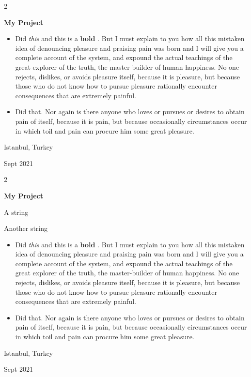\documentclass[10pt, letterpaper]{article}
\newenvironment{summary}{
    \begin{description}[
        topsep=0.10 cm,
        parsep=0.10 cm,
        partopsep=0pt,
        itemsep=0pt,
        leftmargin=0.4 cm + 10pt
    ]
}{
    \end{description}
} %
\newenvironment{highlights}{
    \begin{itemize}[
        topsep=0.10 cm,
        parsep=0.10 cm,
        partopsep=0pt,
        itemsep=0pt,
        leftmargin=0.4 cm + 10pt
    ]
}{
    \end{itemize}
} %
\newenvironment{twocolentry}[2][]{
    \onecolentry
    \def\secondColumn{#2}
    \setcolumnwidth{\fill, 4.5 cm}
    \begin{paracol}{2}
}{
    \switchcolumn \raggedleft \secondColumn
    \end{paracol}
    \endonecolentry
} %
\let\hrefWithoutArrow\href
\renewcommand{\href}[2]{\hrefWithoutArrow{#1}{\ifthenelse{\equal{#2}{}}{ }{#2 }\raisebox{.15ex}{\footnotesize \faExternalLink*}}}
\begin{document}
        \begin{twocolentry}{
            Istanbul, Turkey

        Sept 2021
        }
            \textbf{My Project}
            \begin{highlights}
                \item Did \textit{this} and this is a \textbf{bold} \href{https://example.com}{link}. But I must explain to you how all this mistaken idea of denouncing pleasure and praising pain was born and I will give you a complete account of the system, and expound the actual teachings of the great explorer of the truth, the master-builder of human happiness. No one rejects, dislikes, or avoids pleasure itself, because it is pleasure, but because those who do not know how to pursue pleasure rationally encounter consequences that are extremely painful.
                \item Did that. Nor again is there anyone who loves or pursues or desires to obtain pain of itself, because it is pain, but because occasionally circumstances occur in which toil and pain can procure him some great pleasure.
            \end{highlights}
        \end{twocolentry}


        \vspace{0.2 cm}

        \begin{twocolentry}{
            Istanbul, Turkey

        Sept 2021
        }
            \textbf{My Project}
            \begin{summary}
                \item A string
                \item Another string
            \end{summary}
            \begin{highlights}
                \item Did \textit{this} and this is a \textbf{bold} \href{https://example.com}{link}. But I must explain to you how all this mistaken idea of denouncing pleasure and praising pain was born and I will give you a complete account of the system, and expound the actual teachings of the great explorer of the truth, the master-builder of human happiness. No one rejects, dislikes, or avoids pleasure itself, because it is pleasure, but because those who do not know how to pursue pleasure rationally encounter consequences that are extremely painful.
                \item Did that. Nor again is there anyone who loves or pursues or desires to obtain pain of itself, because it is pain, but because occasionally circumstances occur in which toil and pain can procure him some great pleasure.
            \end{highlights}
        \end{twocolentry}
\end{document}

